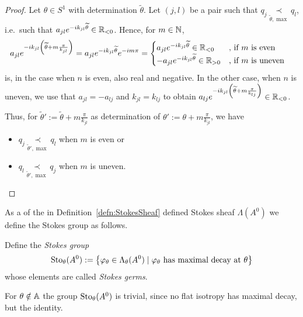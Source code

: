 \begin{proof}
  Let $\theta\in S^1$ with determination $\tilde\theta$.
  Let $(j,l)$ be a pair such that
  $q_j \underset{\tilde\theta,\max}{\prec} q_l$, i.e.\ such that
  $a_{jl}e^{-ik_{jl}\widetilde\theta}\in\mathbb{R}_{<0}$.
  Hence, for $m\in\mathbb{N}$,
  \begin{align*}
    a_{jl}e^{-ik_{jl}\left(\widetilde\theta+m\frac{\pi}{k_{jl}}\right)}
    &=a_{jl}e^{-ik_{jl}\widetilde\theta}e^{-im\pi}
    = \begin{cases}
      a_{jl}e^{-ik_{jl}\widetilde\theta}\in\mathbb{R}_{<0}
        & \text{, if $m$ is even}
    \\-a_{jl}e^{-ik_{jl}\widetilde\theta}\in\mathbb{R}_{>0}
        & \text{, if $m$ is uneven}
    \end{cases}
  \end{align*}
  is, in the case when $n$ is even, also real and negative. In the other
  case, when $n$ is uneven, we use that $a_{jl}=-a_{lj}$ and
  $k_{jl}=k_{lj}$ to obtain
  $a_{lj}e^{-ik_{jl}\left(\widetilde\theta+m\frac{\pi}{k_{lj}}\right)}
  \in\mathbb{R}_{<0}$.

  Thus, for $\tilde\theta':=\tilde\theta+m\frac{\pi}{k_{jl}}$ as
  determination of $\theta':=\theta+m\frac{\pi}{k_{jl}}$, we have
  \begin{itemize}
    \item $q_j \underset{\tilde\theta',\max}{\prec} q_l$ when $m$ is even
      or
    \item $q_l \underset{\tilde\theta',\max}{\prec} q_j$ when $m$ is
      uneven.
  \end{itemize}
\end{proof}

As a  of the in
Definition~\ref{defn:StokesSheaf} defined Stokes sheaf $\Lambda(A^0)$ we
define the Stokes group as follows.
\begin{defn}\label{defn:stokesGroup}
  Define the \emph{Stokes group}
  \[
    \operatorname{Sto}_\theta(A^0):=
    \left\{\varphi_\theta\in\Lambda_\theta(A^0)
      \mid \varphi_\theta \text{ has maximal decay at } \theta
    \right\}
  \]
  whose elements are called \emph{Stokes germs}.
  \begin{s-rem}
    For $\theta\notin\mathbb{A}$ the group $\operatorname{Sto}_\theta(A^0)$ is trivial, since no flat
    isotropy has maximal decay, but the identity.

  \end{s-rem}
\end{defn}


